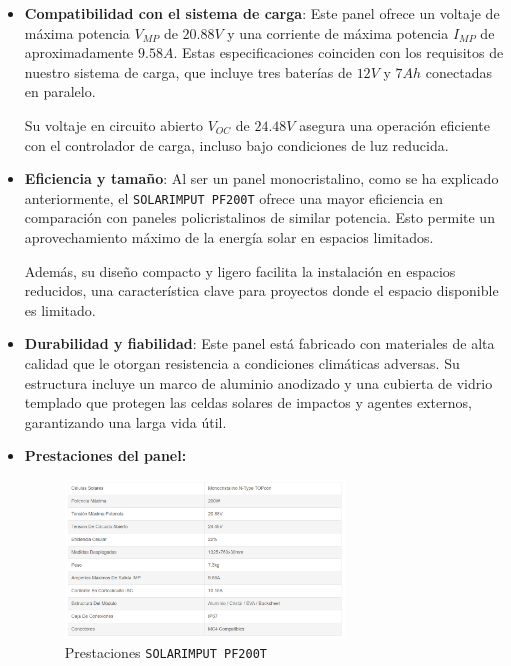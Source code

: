 \begin{itemize}
    \item \textbf{Compatibilidad con el sistema de carga}: Este panel ofrece un voltaje de máxima potencia $V_{MP}$ de $20.88 V$ y una corriente de máxima potencia $I_{MP}$  de aproximadamente $9.58 A$. Estas especificaciones coinciden con los requisitos de nuestro sistema de carga, que incluye tres baterías de $12 V$ y $7 Ah$ conectadas en paralelo.

    Su voltaje en circuito abierto $V_{OC}$  de $24.48 V$ asegura una operación eficiente con el controlador de carga, incluso bajo condiciones de luz reducida.

    \item \textbf{Eficiencia y tamaño}: Al ser un panel monocristalino, como se ha explicado anteriormente, el \texttt{SOLARIMPUT PF200T} ofrece una mayor eficiencia en comparación con paneles policristalinos de similar potencia. Esto permite un aprovechamiento máximo de la energía solar en espacios limitados.

    Además, su diseño compacto y ligero facilita la instalación en espacios reducidos, una característica clave para proyectos donde el espacio disponible es limitado.

    \item \textbf{Durabilidad y fiabilidad}: Este panel está fabricado con materiales de alta calidad que le otorgan resistencia a condiciones climáticas adversas. Su estructura incluye un marco de aluminio anodizado y una cubierta de vidrio templado que protegen las celdas solares de impactos y agentes externos, garantizando una larga vida útil.

    \item \textbf{Prestaciones del panel:}
    \begin{figure}[H]
        \centering
        \includegraphics[width=0.7\textwidth]{images/2-hardware/Panel Solar/Caracteristicas.png}
        \caption{Prestaciones \texttt{SOLARIMPUT PF200T}}
        \label{fig:4-1-1-PanelSolar}
    \end{figure}
\end{itemize}

